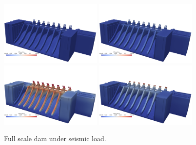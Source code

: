 \begin{figure}
    \centering
    \includegraphics[width=0.45\textwidth]{./Images/dam1.png}    \includegraphics[width=0.45\textwidth]{./Images/dam2.png}\\
    \includegraphics[width=0.45\textwidth]{./Images/dam3.png}
    \includegraphics[width=0.45\textwidth]{./Images/dam4.png}
    \caption{Full scale dam under seismic load.}
    \label{fig:dam}
\end{figure}

